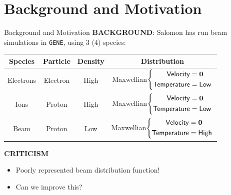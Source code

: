\section{Background and Motivation}
    \begin{frame}{Background and Motivation}
        \vspace{0.5mm}
        {\bf BACKGROUND}: Salomon has run beam simulations in {\tt GENE}, using 3 (4) species:
        \vspace{0.5mm}
        {\footnotesize \begin{center}\begin{tabular}{ c || c | c | c }
            Species  &  Particle  &  Density  &  Distribution  \\
            \hline\hline
            Electrons  &  Electron  &  High  &  Maxwellian$\left\{\begin{aligned}  {\sf Velocity}  &=  \mathbf{0} 
    \\  {\sf Temperature}  &=  {\sf Low}  \end{aligned}\right.$  \\
            \hline
            Ions  &  Proton  &  High  &  Maxwellian$\left\{\begin{aligned}  {\sf Velocity}  &=  \mathbf{0} 
    \\  {\sf Temperature}  &=  {\sf Low}  \end{aligned}\right.$  \\
            \hline
            Beam  &  Proton  &  Low  &  Maxwellian$\left\{\begin{aligned}  {\sf Velocity}  &=  \mathbf{0}
    \\  {\sf Temperature}  &=  {\sf High}  \end{aligned}\right.$
        \end{tabular}\end{center}}  \pause
        
        \begin{alertblock}{\bf CRITICISM}
            \begin{itemize}
                \item  Poorly represented beam distribution function!

                \item  Can we improve this?
            \end{itemize}
        \end{alertblock}
    \end{frame}
    

